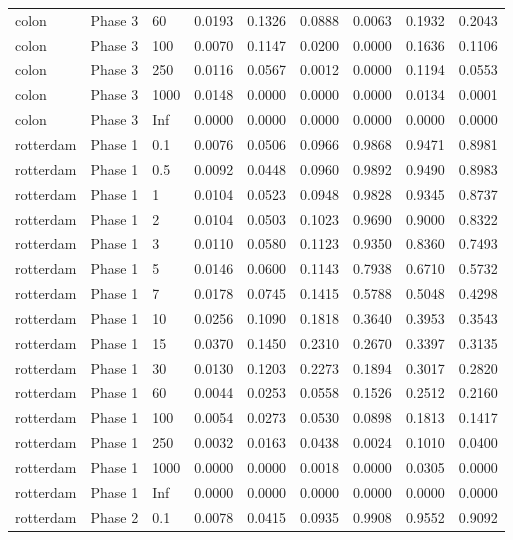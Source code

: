\begin{tabular}{lllllllll}
  colon & Phase 3 & 60 & 0.0193 & 0.1326 & 0.0888 & 0.0063 & 0.1932 & 0.2043 \\ 
  colon & Phase 3 & 100 & 0.0070 & 0.1147 & 0.0200 & 0.0000 & 0.1636 & 0.1106 \\ 
  colon & Phase 3 & 250 & 0.0116 & 0.0567 & 0.0012 & 0.0000 & 0.1194 & 0.0553 \\ 
  colon & Phase 3 & 1000 & 0.0148 & 0.0000 & 0.0000 & 0.0000 & 0.0134 & 0.0001 \\ 
  colon & Phase 3 & Inf & 0.0000 & 0.0000 & 0.0000 & 0.0000 & 0.0000 & 0.0000 \\ 
  rotterdam & Phase 1 & 0.1 & 0.0076 & 0.0506 & 0.0966 & 0.9868 & 0.9471 & 0.8981 \\ 
  rotterdam & Phase 1 & 0.5 & 0.0092 & 0.0448 & 0.0960 & 0.9892 & 0.9490 & 0.8983 \\ 
  rotterdam & Phase 1 & 1 & 0.0104 & 0.0523 & 0.0948 & 0.9828 & 0.9345 & 0.8737 \\ 
  rotterdam & Phase 1 & 2 & 0.0104 & 0.0503 & 0.1023 & 0.9690 & 0.9000 & 0.8322 \\ 
  rotterdam & Phase 1 & 3 & 0.0110 & 0.0580 & 0.1123 & 0.9350 & 0.8360 & 0.7493 \\ 
  rotterdam & Phase 1 & 5 & 0.0146 & 0.0600 & 0.1143 & 0.7938 & 0.6710 & 0.5732 \\ 
  rotterdam & Phase 1 & 7 & 0.0178 & 0.0745 & 0.1415 & 0.5788 & 0.5048 & 0.4298 \\ 
  rotterdam & Phase 1 & 10 & 0.0256 & 0.1090 & 0.1818 & 0.3640 & 0.3953 & 0.3543 \\ 
  rotterdam & Phase 1 & 15 & 0.0370 & 0.1450 & 0.2310 & 0.2670 & 0.3397 & 0.3135 \\ 
  rotterdam & Phase 1 & 30 & 0.0130 & 0.1203 & 0.2273 & 0.1894 & 0.3017 & 0.2820 \\ 
  rotterdam & Phase 1 & 60 & 0.0044 & 0.0253 & 0.0558 & 0.1526 & 0.2512 & 0.2160 \\ 
  rotterdam & Phase 1 & 100 & 0.0054 & 0.0273 & 0.0530 & 0.0898 & 0.1813 & 0.1417 \\ 
  rotterdam & Phase 1 & 250 & 0.0032 & 0.0163 & 0.0438 & 0.0024 & 0.1010 & 0.0400 \\ 
  rotterdam & Phase 1 & 1000 & 0.0000 & 0.0000 & 0.0018 & 0.0000 & 0.0305 & 0.0000 \\ 
  rotterdam & Phase 1 & Inf & 0.0000 & 0.0000 & 0.0000 & 0.0000 & 0.0000 & 0.0000 \\ 
  rotterdam & Phase 2 & 0.1 & 0.0078 & 0.0415 & 0.0935 & 0.9908 & 0.9552 & 0.9092 \\ 

\end{tabular}
